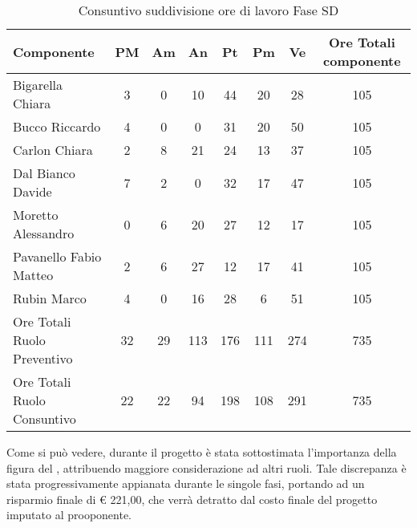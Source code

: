 	\begin{table}[H]
				\begin{center}
					\begin{tabular}{| l | c | c | c | c | c | c | c |}
						\hline
						Componente 					& PM	& Am	 & An 		& Pt 		& Pm 	& Ve 	& Ore Totali componente \\ \hline
						
						Bigarella Chiara 			& 3		& 0		& 10 		& 44 		& 20		& 28 		& 105 \\
						Bucco Riccardo 				& 4& 0		& 0			& 31 	& 20		& 50 		& 105 \\
						Carlon Chiara	 			& 2		& 8 & 21 		& 24			& 13		& 37	& 105 \\
						Dal Bianco Davide 			& 7		& 2 & 0			& 32 		& 17		& 47	& 105 \\
						Moretto Alessandro 			& 0		& 6 	& 20 		& 27 		& 12		& 17 		& 105 \\
						Pavanello Fabio Matteo	 	& 2		& 6 & 27	& 12	& 17		& 41	& 105 \\
						Rubin Marco					& 4 	& 0		& 16 		& 28			& 6		& 51	& 105 \\ \hline \hline
						
						Ore Totali Ruolo Preventivo	& 32 	& 29 	& 113 		& 176 		& 111		& 274		& 735\\ 
						Ore Totali Ruolo Consuntivo	& 22 	& 22 	& 94 		& 198 		& 108		& 291		& 735\\ \hline
					\end{tabular}
				\end{center}
				\caption{Consuntivo suddivisione ore di lavoro Fase SD}
			\end{table}
	
		Come si può vedere, durante il progetto è stata sottostimata l'importanza della figura del , attribuendo maggiore considerazione ad altri ruoli. Tale discrepanza è stata progressivamente appianata durante le singole fasi, portando ad un risparmio finale di \euro{} 221,00, che verrà detratto dal costo finale del progetto imputato al prooponente.
		
		
	

